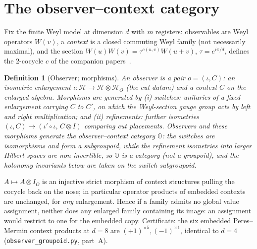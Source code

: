 \documentclass[11pt]{article}
\newtheorem{definition}{Definition}\newtheorem{corollary}{Corollary}\newtheorem*{remark}{Remark}
\begin{document}
\section{The observer--context category}
Fix the finite Weyl model at dimension $d$ with $m$ registers: observables are Weyl
operators $W(v)$, a \emph{context} is a closed commuting Weyl family (not necessarily
maximal), and the section $W(u)W(v)=\tau^{c(u,v)}W(u{+}v)$, $\tau=e^{i\pi/d}$, defines
the $2$-cocycle $c$ of the companion papers~\cite{paperA,paperC}.
\begin{definition}[Observer; morphisms]
An \emph{observer} is a pair $o=(\iota,C)$: an isometric enlargement
$\iota:\mathcal H\to\mathcal H\otimes\mathcal H_O$ (the \emph{cut datum}) and a context
$C$ on the enlarged algebra. Morphisms are generated by (i) \emph{switches}: unitaries
of a fixed enlargement carrying $C$ to $C'$, on which the Weyl-section gauge group acts
by left and right multiplication; and (ii) \emph{refinements}: further isometries
$(\iota,C)\to(\iota'\!\circ\iota,\,C\otimes I)$ comparing cut placements. Observers and
these morphisms generate the \emph{observer--context category} $\mathbb O$: the switches are
isomorphisms and form a subgroupoid, while the refinement isometries into larger Hilbert spaces are
non-invertible, so $\mathbb O$ is a category (not a groupoid), and the holonomy invariants below are
taken on the switch subgroupoid.
\end{definition}
\begin{lemma}\label{lem:pull}
$A\mapsto A\otimes I_O$ is an injective strict morphism of context structures pulling
the cocycle back on the nose; in particular operator products of embedded contexts are
unchanged, for \emph{any} enlargement. Hence if a family admits no global value
assignment, neither does any enlarged family containing its image: an assignment would
restrict to one for the embedded copy. Certificate: the six embedded Peres--Mermin
context products at $d=8$ are $(+1)^{\times5},(-1)^{\times1}$, identical to $d=4$
(\texttt{observer\_groupoid.py}, part~A).
\end{lemma}
\end{document}
